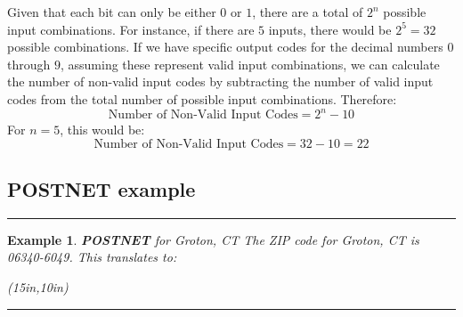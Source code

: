 \documentclass[12pt]{article}
\newtheorem{example}{Example}
\newenvironment{examp}
{\vspace{0.5cm}
\hrule
\begin{example}}
{\hrule
\vspace{0.5cm}
\end{example}}
\begin{document}
Given that each bit can only be either \(0\) or \(1\), there are a total of \(2^n\) possible input combinations.
For instance, if there are \(5\) inputs, there would be \(2^5 = 32\) possible combinations.
If we have specific output codes for the decimal numbers \(0\) through \(9\),
assuming these represent valid input combinations, we can calculate the number of non-valid input codes by subtracting the number of valid input codes from the total number of possible input combinations. Therefore:
\[
	\text{Number of Non-Valid Input Codes} = 2^n - 10
\]
For \(n = 5\), this would be:
\[
	\text{Number of Non-Valid Input Codes} = 32 - 10 = 22
\]

\subsection*{\textbf{POSTNET} example}
\begin{examp}
	\vspace{.3mm}
	\textbf{POSTNET} for Groton, CT
	\vspace{.5cm}
	\newline
	The ZIP code for Groton, CT is 06340-6049. This translates to:
	\begin{center}
		\begin{pspicture}(15in,10in)
		\end{pspicture}
	\end{center}
\end{examp}
\newpage
\end{document}
